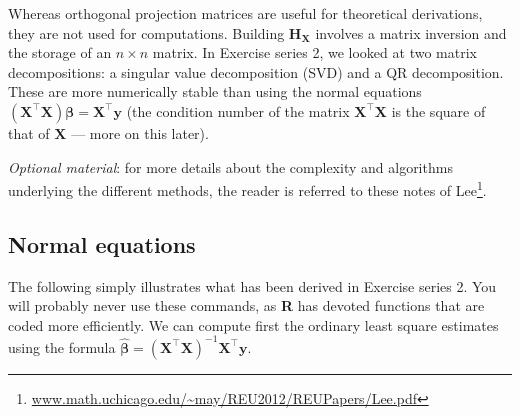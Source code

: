 \documentclass[]{book}
\newenvironment{Shaded}{\begin{snugshade}}{\end{snugshade}}
\newcommand{\KeywordTok}[1]{\textcolor[rgb]{0.13,0.29,0.53}{\textbf{#1}}}
\newcommand{\DataTypeTok}[1]{\textcolor[rgb]{0.13,0.29,0.53}{#1}}
\newcommand{\DecValTok}[1]{\textcolor[rgb]{0.00,0.00,0.81}{#1}}
\newcommand{\StringTok}[1]{\textcolor[rgb]{0.31,0.60,0.02}{#1}}
\newcommand{\CommentTok}[1]{\textcolor[rgb]{0.56,0.35,0.01}{\textit{#1}}}
\newcommand{\OperatorTok}[1]{\textcolor[rgb]{0.81,0.36,0.00}{\textbf{#1}}}
\newcommand{\NormalTok}[1]{#1}
\let\rmarkdownfootnote\footnote%
\def\footnote{\protect\rmarkdownfootnote}
\renewcommand{\href}[2]{#2\footnote{\url{#1}}}
\theoremstyle{definition}
\theoremstyle{definition}
\theoremstyle{definition}
\theoremstyle{remark}
\begin{document}
Whereas orthogonal projection matrices are useful for theoretical
derivations, they are not used for computations. Building
\(\mathbf{H}_{\mathbf{X}}\) involves a matrix inversion and the storage
of an \(n \times n\) matrix. In Exercise series 2, we looked at two
matrix decompositions: a singular value decomposition (SVD) and a QR
decomposition. These are more numerically stable than using the normal
equations
\((\mathbf{X}^\top\mathbf{X})\boldsymbol{\beta} = \mathbf{X}^\top\boldsymbol{y}\)
(the condition number of the matrix \(\mathbf{X}^\top\mathbf{X}\) is the
square of that of \(\mathbf{X}\) --- more on this later).

\emph{Optional material}: for more details about the complexity and
algorithms underlying the different methods, the reader is referred to
these notes of
\href{www.math.uchicago.edu/~may/REU2012/REUPapers/Lee.pdf}{Lee}.

\subsection{Normal equations}\label{normal-equations}

The following simply illustrates what has been derived in Exercise
series 2. You will probably never use these commands, as \textbf{R} has
devoted functions that are coded more efficiently. We can compute first
the ordinary least square estimates using the formula
\(\hat{\boldsymbol{\beta}} = (\mathbf{X}^\top\mathbf{X})^{-1}\mathbf{X}^\top\boldsymbol{y}\).

\begin{Shaded}
\end{Shaded}
\end{document}
